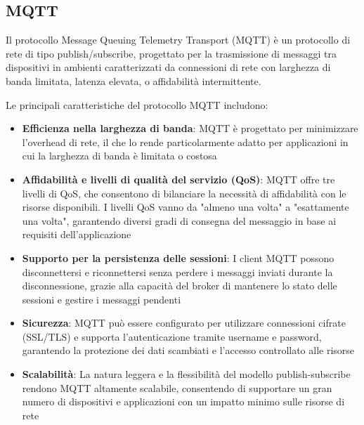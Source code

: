 \subsection{MQTT} \label{mqtt}

Il protocollo Message Queuing Telemetry Transport (MQTT) è un protocollo di rete di tipo publish/subscribe, progettato per la trasmissione di messaggi tra dispositivi in ambienti caratterizzati da connessioni di rete con larghezza di banda limitata, latenza elevata, o affidabilità intermittente.

\noindent Le principali caratteristiche del protocollo MQTT includono:

\begin{itemize}
  \item \textbf{Efficienza nella larghezza di banda}: MQTT è progettato per minimizzare l'overhead di rete, il che lo rende particolarmente adatto per applicazioni in cui la larghezza di banda è limitata o costosa
    
  \item \textbf{Affidabilità e livelli di qualità del servizio (QoS)}: MQTT offre tre livelli di QoS, che consentono di bilanciare la necessità di affidabilità con le risorse disponibili. I livelli QoS vanno da "almeno una volta" a "esattamente una volta", garantendo diversi gradi di consegna del messaggio in base ai requisiti dell'applicazione
    
  \item \textbf{Supporto per la persistenza delle sessioni}: I client MQTT possono disconnettersi e riconnettersi senza perdere i messaggi inviati durante la disconnessione, grazie alla capacità del broker di mantenere lo stato delle sessioni e gestire i messaggi pendenti

  \item \textbf{Sicurezza}: MQTT può essere configurato per utilizzare connessioni cifrate (SSL/TLS) e supporta l'autenticazione tramite username e password, garantendo la protezione dei dati scambiati e l'accesso controllato alle risorse

  \item \textbf{Scalabilità}: La natura leggera e la flessibilità del modello publish-subscribe rendono MQTT altamente scalabile, consentendo di supportare un gran numero di dispositivi e applicazioni con un impatto minimo sulle risorse di rete
\end{itemize}

